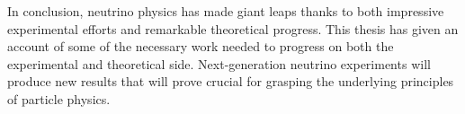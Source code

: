 In conclusion, neutrino physics has made giant leaps thanks to both impressive experimental efforts %
and remarkable theoretical progress.
This thesis has given an account of some of the necessary work needed to progress on both %
the experimental and theoretical side.
Next-generation neutrino experiments will produce new results that will prove crucial for grasping the underlying %
principles of particle physics.
